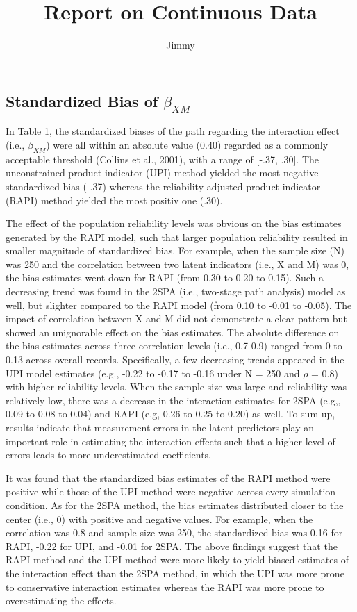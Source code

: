\documentclass[
  man]{apa7}
\title{Report on Continuous Data}
\author{Jimmy\textsuperscript{}}
\date{}
\affiliation{\phantom{0}}
\begin{document}
\maketitle

\hypertarget{standardized-bias-of-beta_xm}{%
\subsection{\texorpdfstring{Standardized Bias of \(\beta_{XM}\)}{Standardized Bias of \textbackslash beta\_\{XM\}}}\label{standardized-bias-of-beta_xm}}

In Table 1, the standardized biases of the path regarding the interaction effect (i.e., \(\beta_{XM}\)) were all within an absolute value (0.40) regarded as a commonly acceptable threshold (Collins et al., 2001), with a range of {[}-.37, .30{]}. The unconstrained product indicator (UPI) method yielded the most negative standardized bias (-.37) whereas the reliability-adjusted product indicator (RAPI) method yielded the most positiv one (.30).

The effect of the population reliability levels was obvious on the bias estimates generated by the RAPI model, such that larger population reliability resulted in smaller magnitude of standardized bias. For example, when the sample size (N) was 250 and the correlation between two latent indicators (i.e., X and M) was 0, the bias estimates went down for RAPI (from 0.30 to 0.20 to 0.15). Such a decreasing trend was found in the 2SPA (i.e., two-stage path analysis) model as well, but slighter compared to the RAPI model (from 0.10 to -0.01 to -0.05). The impact of correlation between X and M did not demonstrate a clear pattern but showed an unignorable effect on the bias estimates. The absolute difference on the bias estimates across three correlation levels (i.e., 0.7-0.9) ranged from 0 to 0.13 across overall records. Specifically, a few decreasing trends appeared in the UPI model estimates (e.g., -0.22 to -0.17 to -0.16 under N = 250 and \(\rho\) = 0.8) with higher reliability levels. When the sample size was large and reliability was relatively low, there was a decrease in the interaction estimates for 2SPA (e.g,, 0.09 to 0.08 to 0.04) and RAPI (e.g, 0.26 to 0.25 to 0.20) as well. To sum up, results indicate that measurement errors in the latent predictors play an important role in estimating the interaction effects such that a higher level of errors leads to more underestimated coefficients.

It was found that the standardized bias estimates of the RAPI method were positive while those of the UPI method were negative across every simulation condition. As for the 2SPA method, the bias estimates distributed closer to the center (i.e., 0) with positive and negative values. For example, when the correlation was 0.8 and sample size was 250, the standardized bias was 0.16 for RAPI, -0.22 for UPI, and -0.01 for 2SPA. The above findings suggest that the RAPI method and the UPI method were more likely to yield biased estimates of the interaction effect than the 2SPA method, in which the UPI was more prone to conservative interaction estimates whereas the RAPI was more prone to overestimating the effects.
\end{document}
